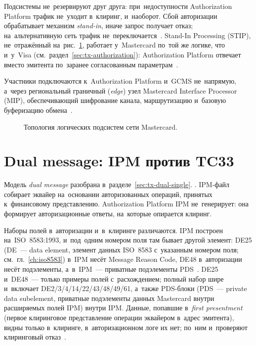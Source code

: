Подсистемы не~резервируют друг друга: при~недоступности Authorization Platform
трафик не~уходит в~клиринг, и~наоборот. Сбой авторизации обрабатывает
механизм \textit{stand-in}, иначе запрос получает отказ; на~альтернативную
сеть трафик не~переключается~\cite{mc-switching-services}. Stand-In Processing
(STIP), не~отражённый на~рис.~\ref{fig:banknet-topology}, работает
у~Mastercard по~той же логике, что и~у~Visa
(см.~раздел~\ref{sec:tx-authorization}): Authorization Platform отвечает
вместо эмитента по~заранее согласованным
параметрам~\cite{mc-switching-services}.

Участники подключаются к~Authorization Platform и~GCMS не~напрямую, а~через
региональный граничный (\textit{edge}) узел Mastercard
Interface Processor (MIP), обеспечивающий шифрование канала, маршрутизацию
и~базовую буферизацию обмена~\cite{mc-switching-services}.

\begin{figure}[htbp]
  \centering
  \caption{Топология логических подсистем сети Mastercard.}\label{fig:banknet-topology}
\end{figure}

\section{Dual message: IPM против TC33}\label{sec:mc-dmsa}

Модель \textit{dual message} разобрана в~разделе~\ref{sec:tx-dual-single}.
. IPM-файл собирает эквайер
на~основании авторизованных операций, принятых к~финансовому представлению.
Authorization Platform IPM не~генерирует: она формирует авторизационные
ответы, на~которые опирается клиринг.

Наборы полей в~авторизации и~в~клиринге различаются. IPM построен
на~ISO~8583:1993, и~под~одним номером поля там бывает другой элемент: DE25
(DE~--- data element, элемент данных ISO~8583 с~указанным номером поля;
см.~гл.~\ref{ch:iso8583}) в~IPM несёт Message Reason Code, DE48
в~авторизации несёт подэлементы, а~в~IPM~--- приватные подэлементы
PDS~\cite{mc-gcms-rm-2021}. DE25 и~DE48~--- только примеры полей
с~расхождением; полный набор шире и~включает DE2/3/4/14/22/43/48/49/61,
а~также PDS-блоки (PDS~--- private data subelement, приватные подэлементы
данных Mastercard внутри расширяемых полей IPM) внутри IPM.
Данные, попавшие в~\textit{first presentment} (первое клиринговое
представление операции эквайером в~адрес эмитента), видны только в~клиринге,
в~авторизационном логе их нет; по~ним и~проверяют клиринговый
отказ~\cite{mc-chargeback-guide}.

